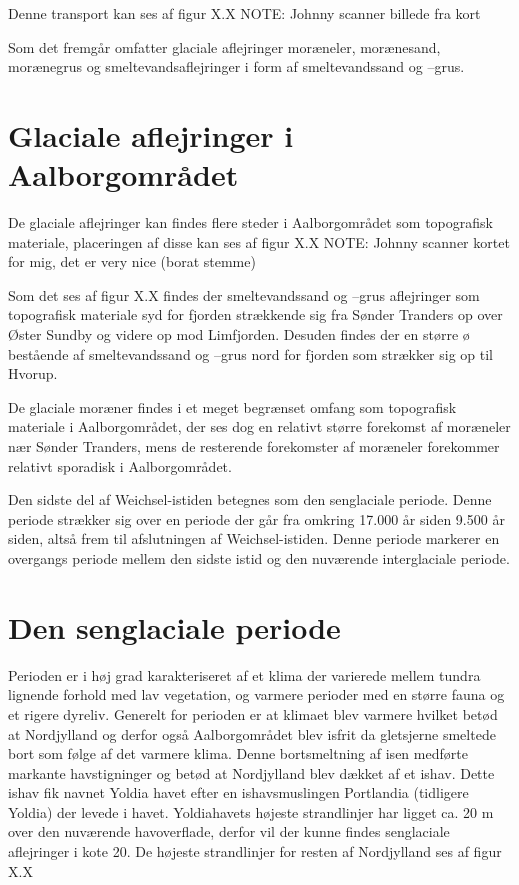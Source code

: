 Denne transport kan ses af figur X.X 
NOTE: Johnny scanner billede fra kort  


Som det fremgår omfatter glaciale aflejringer moræneler, morænesand, morænegrus og smeltevandsaflejringer i form af smeltevandssand og –grus. 

\section{Glaciale aflejringer i Aalborgområdet}
De glaciale aflejringer kan findes flere steder i Aalborgområdet som topografisk materiale, placeringen af disse kan ses af figur X.X 
NOTE: Johnny scanner kortet for mig, det er very nice (borat stemme)

Som det ses af figur X.X findes der smeltevandssand og –grus aflejringer som topografisk materiale syd for fjorden strækkende sig fra Sønder Tranders op over Øster Sundby og videre op mod Limfjorden. Desuden findes der en større ø bestående af smeltevandssand og –grus nord for fjorden som strækker sig op til Hvorup. 

De glaciale moræner findes i et meget begrænset omfang som topografisk materiale i Aalborgområdet, der ses dog en relativt større forekomst af moræneler nær Sønder Tranders, mens de resterende forekomster af moræneler forekommer relativt sporadisk i Aalborgområdet.
 
Den sidste del af Weichsel-istiden betegnes som den senglaciale periode. Denne periode strækker sig over en periode der går fra omkring 17.000 år siden 9.500 år siden, altså frem til afslutningen af Weichsel-istiden. Denne periode markerer en overgangs periode mellem den sidste istid og den nuværende interglaciale periode. 

\section{Den senglaciale periode}
Perioden er i høj grad karakteriseret af et klima der varierede mellem tundra lignende forhold med lav vegetation, og varmere perioder med en større fauna og et rigere dyreliv. Generelt for perioden er at klimaet blev varmere hvilket betød at Nordjylland og derfor også Aalborgområdet blev isfrit da gletsjerne smeltede bort som følge af det varmere klima. Denne bortsmeltning af isen medførte markante havstigninger og betød at Nordjylland blev dækket af et ishav. Dette ishav fik navnet Yoldia havet efter en ishavsmuslingen Portlandia (tidligere Yoldia) der levede i havet. Yoldiahavets højeste strandlinjer har ligget ca. 20 m over den nuværende havoverflade, derfor vil der kunne findes senglaciale aflejringer i kote 20. De højeste strandlinjer for resten af Nordjylland ses af figur X.X


